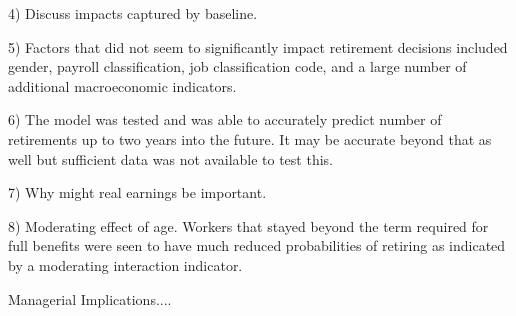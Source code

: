 \documentclass[12pt,letterpaper]{article}
\begin{document}
4) Discuss impacts captured by baseline.

5) Factors that did not seem to significantly impact retirement decisions included gender, payroll classification, job classification code, and a large number of additional macroeconomic indicators.

6) The model was tested and was able to accurately predict number of retirements up to two years into the future.  It may be accurate beyond that as well but sufficient data was not available to test this.

7) Why might real earnings be important.

8) Moderating effect of age.  Workers that stayed beyond the term required for full benefits were seen to have much reduced probabilities of retiring as indicated by a moderating interaction indicator.


Managerial Implications....

	
\end{document}
